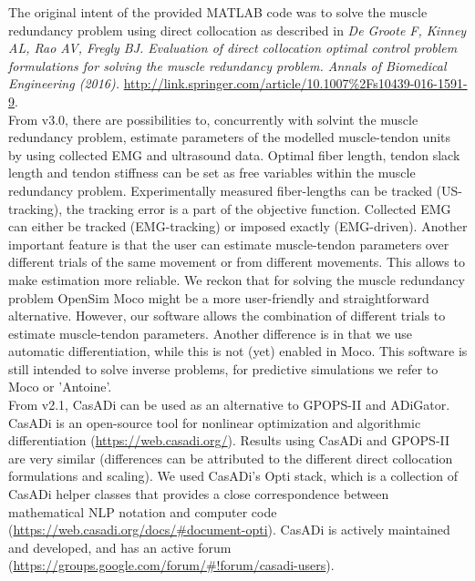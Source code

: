 \documentclass[a4paper,oneside,11pt]{article}
\begin{document}
The original intent of the provided MATLAB code was to solve the muscle redundancy problem using direct collocation as described in \textit{De Groote F, Kinney AL, Rao AV, Fregly BJ. Evaluation of direct collocation optimal control problem formulations for solving the muscle redundancy problem. Annals of Biomedical Engineering (2016).} \url{http://link.springer.com/article/10.1007%2Fs10439-016-1591-9}. 
\\

From v3.0, there are possibilities to, concurrently with solvint the muscle redundancy problem, estimate parameters of the modelled muscle-tendon units by using collected EMG and ultrasound data. Optimal fiber length, tendon slack length and tendon stiffness can be set as free variables within the muscle redundancy problem. Experimentally measured fiber-lengths can be tracked (US-tracking), the tracking error is a part of the objective function. Collected EMG can either be tracked (EMG-tracking) or imposed exactly (EMG-driven). Another important feature is that the user can estimate muscle-tendon parameters over different trials of the same movement or from different movements. This allows to make estimation more reliable. We reckon that for solving the muscle redundancy problem OpenSim Moco might be a more user-friendly and straightforward alternative. However, our software allows the combination of different trials to estimate muscle-tendon parameters. Another difference is in that we use automatic differentiation, while this is not (yet) enabled in Moco. This software is still intended to solve inverse problems, for predictive simulations we refer to Moco or 'Antoine'. \\

From v2.1, CasADi can be used as an alternative to GPOPS-II and ADiGator. CasADi is an open-source tool for nonlinear optimization and algorithmic differentiation (\url{https://web.casadi.org/}). Results using CasADi and GPOPS-II are very similar (differences can be attributed to the different direct collocation formulations and scaling). We used CasADi's Opti stack, which is a collection of CasADi helper classes that provides a close correspondence between mathematical NLP notation and computer code (\url{https://web.casadi.org/docs/#document-opti}). CasADi is actively maintained and developed, and has an active forum (\url{https://groups.google.com/forum/#!forum/casadi-users}). \\
\end{document}

